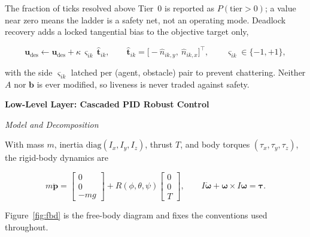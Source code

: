 \documentclass[10pt,letterpaper]{article}
\newcommand{\headingtwo}[1]{%
    \par\vspace{7pt}%
    {\centering\fontsize{12}{14}\selectfont\bfseries #1\par}%
    \vspace{3pt}\noindent\ignorespaces}
\newcommand{\headingthree}[1]{%
    \par\vspace{6pt}%
    {\centering\fontsize{10}{12}\selectfont\itshape #1\par}%
    \vspace{2pt}\noindent\ignorespaces}
\newcommand{\cit}[1]{\cite{#1}}
\begin{document}
The fraction of ticks resolved above Tier~0 is reported as
$P(\mathrm{tier}>0)$; a value near zero means the ladder is a safety net, not an
operating mode. Deadlock recovery adds a locked tangential bias to the objective target
only,

\begin{equation}
    \label{eq:e23}
    \mathbf{u}_{\mathrm{des}}\leftarrow\mathbf{u}_{\mathrm{des}}
    +\kappa\,\varsigma_{ik}\,\hat{\mathbf{t}}_{ik},
    \qquad
    \hat{\mathbf{t}}_{ik}=\bigl[-\hat n_{ik,y},\ \hat n_{ik,x}\bigr]^{\!\top},
    \qquad \varsigma_{ik}\in\{-1,+1\},
\end{equation}

with the side $\varsigma_{ik}$ latched per (agent, obstacle) pair to prevent chattering.
Neither $A$ nor $\mathbf{b}$ is ever modified, so liveness is never traded against safety.

\headingtwo{Low-Level Layer: Cascaded PID Robust Control}

\headingthree{Model and Decomposition}

With mass $m$, inertia $\mathrm{diag}(I_x,I_y,I_z)$, thrust $T$, and body torques
$(\tau_x,\tau_y,\tau_z)$, the rigid-body dynamics are \cit{beardSmallUnmannedAircraft2012}

\begin{equation}
    \label{eq:e24}
    m\ddot{\mathbf{p}}=\begin{bmatrix}0\\0\\-mg\end{bmatrix}+R(\phi,\theta,\psi)\begin{bmatrix}0\\0\\T\end{bmatrix},
    \qquad
    I\dot{\boldsymbol{\omega}}+\boldsymbol{\omega}\times I\boldsymbol{\omega}=\boldsymbol{\tau}.
\end{equation}

Figure~\ref{fig:fbd} is the free-body diagram and fixes the conventions used throughout.
\end{document}
